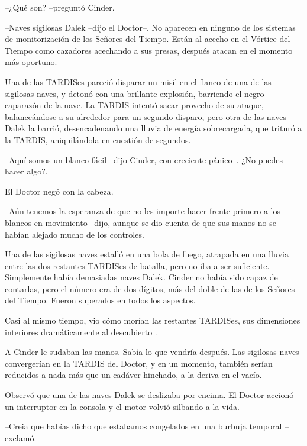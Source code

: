 --¿Qué son? --preguntó Cinder.

--Naves sigilosas Dalek --dijo el Doctor--. No aparecen en ninguno de los sistemas de monitorización de los Señores del Tiempo. Están al acecho en el Vórtice del Tiempo como cazadores acechando a sus presas, después atacan en el momento más oportuno.



Una de las TARDISes pareció disparar un misil en el flanco de una de las sigilosas naves, y detonó con una brillante explosión, barriendo el negro caparazón de la nave. La TARDIS intentó sacar provecho de su ataque, balanceándose a su alrededor para un segundo disparo, pero otra de las naves Dalek la barrió, desencadenando una lluvia de energía sobrecargada, que trituró a la TARDIS, aniquilándola en cuestión de segundos.



--Aquí somos un blanco fácil --dijo Cinder, con creciente pánico--. ¿No puedes hacer algo?.



El Doctor negó con la cabeza. 



--Aún tenemos la esperanza de que no les importe hacer frente primero a los blancos en movimiento --dijo, aunque se dio cuenta de que sus manos no se habían alejado mucho de los controles.



Una de las sigilosas naves estalló en una bola de fuego, atrapada en una lluvia entre las dos restantes TARDISes de batalla, pero no iba a ser suficiente. Simplemente había demasiadas naves Dalek. Cinder no había sido capaz de contarlas, pero el número era de dos dígitos, más del doble de las de los Señores del Tiempo. Fueron superados en todos los aspectos.

Casi al mismo tiempo, vio cómo morían las restantes TARDISes, sus dimensiones interiores dramáticamente al descubierto .

A Cinder le sudaban las manos. Sabía lo que vendría después. Las sigilosas naves convergerían en la TARDIS del Doctor, y en un momento, también serían reducidos a nada más que un cadáver hinchado, a la deriva en el vacío.

Observó que una de las naves Dalek se deslizaba por encima. El Doctor accionó un interruptor en la consola y el motor volvió silbando a la vida.



--Creia que habías dicho que estabamos congelados en una burbuja temporal --exclamó.



